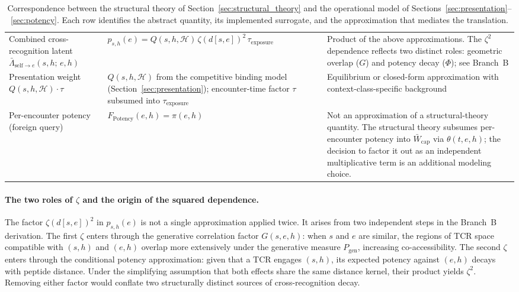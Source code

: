 \documentclass[11pt]{article}
\begin{document}
\begin{table}[H]
\begin{tabular}{p{4.2cm} p{4.8cm} p{5.5cm}}
Combined cross-recognition latent \(\bar{\Lambda}_{\mathrm{self}\to e}(s,h;\,e,h)\) &
\(p_{s,h}(e) = Q(s,h,\mathcal{H})\,\zeta(d[s,e])^2\,\tau_{\mathrm{exposure}}\) &
Product of the above approximations. The \(\zeta^2\) dependence reflects two distinct roles: geometric overlap (\(G\)) and potency decay (\(\Phi\)); see Branch~B \\[4pt]

Presentation weight \(Q(s,h,\mathcal{H})\cdot\tau\) &
\(Q(s,h,\mathcal{H})\) from the competitive binding model (Section~\ref{sec:presentation}); encounter-time factor \(\tau\) subsumed into \(\tau_{\mathrm{exposure}}\) &
Equilibrium or closed-form approximation with context-class-specific background \\[4pt]

Per-encounter potency (foreign query) &
\(F_{\mathrm{Potency}}(e,h) = \pi(e,h)\) &
Not an approximation of a structural-theory quantity. The structural theory subsumes per-encounter potency into \(\bar{W}_{\mathrm{cap}}\) via \(\theta(t,e,h)\); the decision to factor it out as an independent multiplicative term is an additional modeling choice. \\
\hline
\end{tabular}
\caption{Correspondence between the structural theory of Section~\ref{sec:structural_theory} and the operational model of Sections~\ref{sec:presentation}--\ref{sec:potency}. Each row identifies the abstract quantity, its implemented surrogate, and the approximation that mediates the translation.}
\label{tab:bridge}
\end{table}

\paragraph{The two roles of \(\zeta\) and the origin of the squared dependence.}
The factor \(\zeta(d[s,e])^2\) in \(p_{s,h}(e)\) is not a single approximation applied twice. It arises from two independent steps in the Branch~B derivation. The first \(\zeta\) enters through the generative correlation factor \(G(s,e,h)\): when \(s\) and \(e\) are similar, the regions of TCR space compatible with \((s,h)\) and \((e,h)\) overlap more extensively under the generative measure \(P_{\mathrm{gen}}\), increasing co-accessibility. The second \(\zeta\) enters through the conditional potency approximation: given that a TCR engages \((s,h)\), its expected potency against \((e,h)\) decays with peptide distance. Under the simplifying assumption that both effects share the same distance kernel, their product yields \(\zeta^2\). Removing either factor would conflate two structurally distinct sources of cross-recognition decay.
\end{document}
